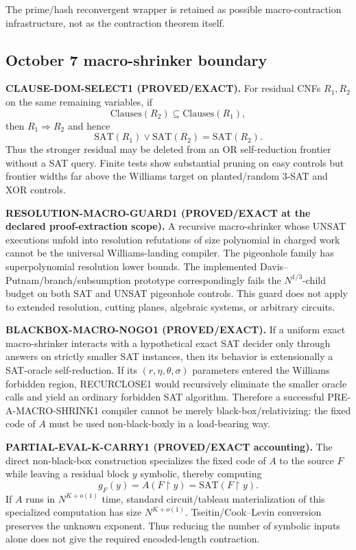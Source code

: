 \documentclass[11pt]{article}
\theoremstyle{plain}
\theoremstyle{definition}
\theoremstyle{remark}
\begin{document}
The prime/hash reconvergent wrapper is retained as possible macro-contraction
infrastructure, not as the contraction theorem itself.


\subsection{October 7 macro-shrinker boundary}

\textbf{CLAUSE-DOM-SELECT1 (PROVED/EXACT).}
For residual CNFs \(R_1,R_2\) on the same remaining variables, if
\[
\mathrm{Clauses}(R_2)\subseteq\mathrm{Clauses}(R_1),
\]
then \(R_1\Rightarrow R_2\) and hence
\[
\mathrm{SAT}(R_1)\vee\mathrm{SAT}(R_2)=\mathrm{SAT}(R_2).
\]
Thus the stronger residual may be deleted from an OR self-reduction frontier
without a SAT query.  Finite tests show substantial pruning on easy controls
but frontier widths far above the Williams target on planted/random 3-SAT and
XOR controls.

\textbf{RESOLUTION-MACRO-GUARD1 (PROVED/EXACT at the declared proof-extraction
scope).}
A recursive macro-shrinker whose UNSAT executions unfold into resolution
refutations of size polynomial in charged work cannot be the universal
Williams-landing compiler.  The pigeonhole family has superpolynomial
resolution lower bounds.  The implemented Davis--Putnam/branch/subsumption
prototype correspondingly fails the \(N^{1/3}\)-child budget on both SAT and
UNSAT pigeonhole controls.  This guard does not apply to extended resolution,
cutting planes, algebraic systems, or arbitrary circuits.

\textbf{BLACKBOX-MACRO-NOGO1 (PROVED/EXACT).}
If a uniform exact macro-shrinker interacts with a hypothetical exact SAT
decider only through answers on strictly smaller SAT instances, then its
behavior is extensionally a SAT-oracle self-reduction.  If its
\((r,\eta,\theta,\sigma)\) parameters entered the Williams forbidden region,
RECURCLOSE1 would recursively eliminate the smaller oracle calls and yield an
ordinary forbidden SAT algorithm.  Therefore a successful
PRE-A-MACRO-SHRINK1 compiler cannot be merely black-box/relativizing:
the fixed code of \(A\) must be used non-black-boxly in a load-bearing way.

\textbf{PARTIAL-EVAL-K-CARRY1 (PROVED/EXACT accounting).}
The direct non-black-box construction specializes the fixed code of \(A\) to
the source \(F\) while leaving a residual block \(y\) symbolic, thereby
computing
\[
g_F(y)=A(F\upharpoonright y)=\mathrm{SAT}(F\upharpoonright y).
\]
If \(A\) runs in \(N^{K+o(1)}\) time, standard circuit/tableau materialization
of this specialized computation has size \(N^{K+o(1)}\).  Tseitin/Cook--Levin
conversion preserves the unknown exponent.  Thus reducing the number of
symbolic inputs alone does not give the required encoded-length contraction.
\end{document}
